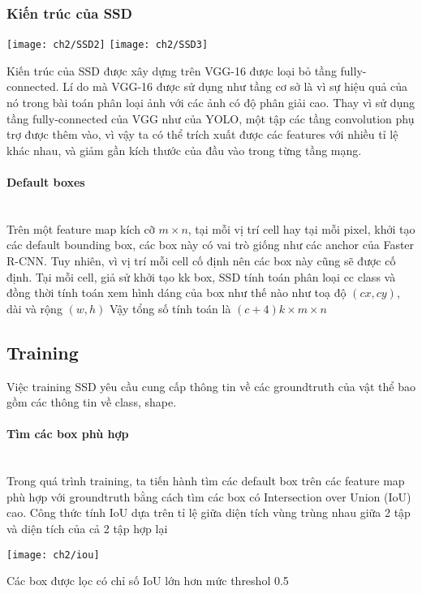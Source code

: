   \subsubsection{Kiến trúc của SSD}
  \begin{center}
  \texttt{[image: ch2/SSD2]}
  \texttt{[image: ch2/SSD3]}
  \end{center}
  Kiến trúc của SSD được xây dựng trên VGG-16 được loại bỏ tầng fully-connected. Lí do mà VGG-16 được sử dụng như tầng cơ sở là vì sự hiệu quả của nó trong bài toán phân loại ảnh với các ảnh có độ phân giải cao. Thay vì sử dụng tầng fully-connected của VGG như của YOLO, một tập các tầng convolution phụ trợ được thêm vào, vì vậy ta có thể trích xuất được các features với nhiều tỉ lệ khác nhau, và giảm gần kích thước của đầu vào trong từng tầng mạng.
  \paragraph{Default boxes}
  \mbox{}\\Trên một feature map kích cỡ \( m \times n\), tại mỗi vị trí cell hay tại mỗi pixel, khởi tạo các default bounding box, các box này có vai trò giống như các anchor của Faster R-CNN. Tuy nhiên, vì vị trí mỗi cell cố định nên các box này cũng sẽ được cố định. Tại mỗi cell, giả sử khởi tạo kk box, SSD tính toán phân loại cc class và đồng thời tính toán xem hình dáng của box như thế nào như toạ độ \((cx,cy)\), dài và rộng \((w,h)\) Vậy tổng số tính toán là \((c+4) k \times m \times n \)

\subsection{Training}
  Việc training SSD yêu cầu cung cấp thông tin về các groundtruth của vật thể bao gồm các thông tin về class, shape.
  \paragraph{Tìm các box phù hợp}
  \mbox{}\\Trong quá trình training, ta tiến hành tìm các default box trên các feature map phù hợp với groundtruth bằng cách tìm các box có Intersection over Union (IoU) cao. Công thức tính IoU dựa trên tỉ lệ giữa diện tích vùng trùng nhau giữa 2 tập và diện tích của cả 2 tập hợp lại
  \begin{center}
  \texttt{[image: ch2/iou]}
  \end{center}
  Các box được lọc có chỉ số IoU lớn hơn mức threshol 0.5
